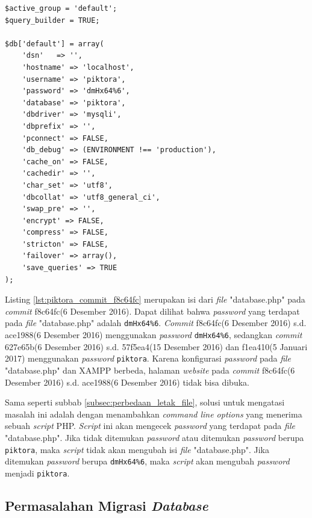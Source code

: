 \begin{lstlisting}[caption={Isi \textit{file} "database.php" pada \textit{commit} f8c64fc(6 Desember 2016)},label={lst:piktora_commit_f8c64fc},language=plaintext]
$active_group = 'default';
$query_builder = TRUE;

$db['default'] = array(
	'dsn'	=> '',
	'hostname' => 'localhost',
	'username' => 'piktora',
	'password' => 'dmHx64%6',
	'database' => 'piktora',
	'dbdriver' => 'mysqli',
	'dbprefix' => '',
	'pconnect' => FALSE,
	'db_debug' => (ENVIRONMENT !== 'production'),
	'cache_on' => FALSE,
	'cachedir' => '',
	'char_set' => 'utf8',
	'dbcollat' => 'utf8_general_ci',
	'swap_pre' => '',
	'encrypt' => FALSE,
	'compress' => FALSE,
	'stricton' => FALSE,
	'failover' => array(),
	'save_queries' => TRUE
);
\end{lstlisting}

Listing \ref{lst:piktora_commit_f8c64fc} merupakan isi dari \textit{file} "database.php" pada \textit{commit} f8c64fc(6 Desember 2016). Dapat dilihat bahwa \textit{password} yang terdapat pada \textit{file} "database.php" adalah \texttt{dmHx64\%6}. \textit{Commit} f8c64fc(6 Desember 2016) s.d. ace1988(6 Desember 2016) menggunakan \textit{password} \texttt{dmHx64\%6}, sedangkan \textit{commit} 627e65b(6 Desember 2016) s.d. 57f5ea4(15 Desember 2016) dan f1ea410(5 Januari 2017) menggunakan \textit{password} \texttt{piktora}. Karena konfigurasi \textit{password} pada \textit{file} "database.php" dan XAMPP berbeda, halaman \textit{website} pada \textit{commit} f8c64fc(6 Desember 2016) s.d. ace1988(6 Desember 2016) tidak bisa dibuka. 

Sama seperti subbab \ref{subsec:perbedaan_letak_file}, solusi untuk mengatasi masalah ini adalah dengan menambahkan \textit{command line options} yang menerima sebuah \textit{script} PHP. \textit{Script} ini akan mengecek \textit{password} yang terdapat pada \textit{file} "database.php". Jika tidak ditemukan \textit{password} atau ditemukan \textit{password} berupa \texttt{piktora}, maka \textit{script} tidak akan mengubah isi \textit{file} "database.php". Jika ditemukan \textit{password} berupa \texttt{dmHx64\%6}, maka \textit{script} akan mengubah \textit{password} menjadi \texttt{piktora}. 

 \subsection{Permasalahan Migrasi \textit{Database}}
\label{subsec:migrasi_database}

